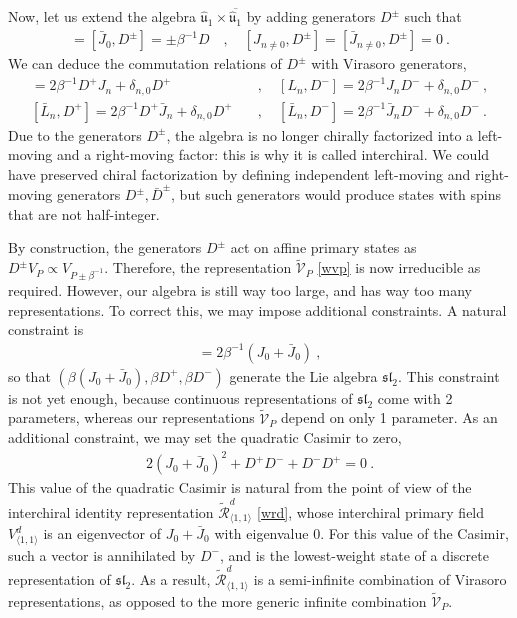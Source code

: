 \documentclass[12pt, a4paper]{article}
\begin{document}
Now, let us extend the algebra $\hat{\mathfrak{u}}_1\times \overline{\hat{\mathfrak{u}}_1}$ by adding generators $D^\pm$ such that 
\begin{align}
 [J_0,D^\pm] = [\bar J_0,D^\pm] = \pm \beta^{-1}D \quad , \quad [J_{n\neq 0},D^\pm]=[\bar J_{n\neq 0},D^\pm]=0 \ .
\end{align}
We can deduce the commutation relations of $D^\pm$ with Virasoro generators,
\begin{align}
 [L_n,D^+] =2\beta^{-1}D^+J_n +\delta_{n,0}D^+ &\quad , \quad [L_n,D^-] =2\beta^{-1}J_nD^- +\delta_{n,0}D^- \ ,
 \\
 [\bar L_n,D^+] =2\beta^{-1}D^+\bar J_n +\delta_{n,0}D^+ &\quad , \quad [\bar L_n,D^-] =2\beta^{-1}\bar J_nD^- +\delta_{n,0}D^- \ .
\end{align}
Due to the generators $D^\pm$, the algebra is no longer chirally factorized into a left-moving and a right-moving factor: this is why it is called interchiral. We could have preserved chiral factorization by defining independent left-moving and right-moving generators $D^\pm,\bar D^\pm$, but such generators would produce states with spins that are not half-integer. 

By construction, the generators $D^\pm$ act on affine primary states as $D^\pm V_P \propto V_{P\pm \beta^{-1}}$. Therefore, the representation $\widetilde{\mathcal{V}}_P$ \eqref{wvp} is now irreducible as required. However, our algebra is still way too large, and has way too many representations. To correct this, we may impose additional constraints. A natural constraint is 
\begin{align}
 [D^+, D^-] = 2\beta^{-1}(J_0+\bar J_0) \ , 
\end{align}
so that $\left(\beta(J_0+\bar J_0),\beta D^+,\beta D^-\right)$ generate the Lie algebra $\mathfrak{sl}_2$. This constraint is not yet enough, because continuous representations of $\mathfrak{sl}_2$ come with 2 parameters, whereas our representations $\widetilde{\mathcal{V}}_P$ depend on only 1 parameter. As an additional constraint, we may set the quadratic Casimir to zero,
\begin{align}
 2(J_0+\bar J_0)^2 + D^+D^- + D^-D^+ = 0 \ .
\end{align}
This value of the quadratic Casimir is natural from the point of view of the interchiral identity representation $\widetilde{\mathcal{R}}^d_{\langle 1,1\rangle}$ \eqref{wrd}, whose interchiral primary field $V^d_{\langle 1,1\rangle}$ is an eigenvector of $J_0+\bar J_0$ with eigenvalue $0$. For this value of the Casimir, such a vector is annihilated by $D^-$, and is the lowest-weight state of a discrete representation of $\mathfrak{sl}_2$. As a result, $\widetilde{\mathcal{R}}^d_{\langle 1,1\rangle}$ is a semi-infinite combination of Virasoro representations, as opposed to the more generic infinite combination $\widetilde{\mathcal{V}}_P$. 
\end{document}
